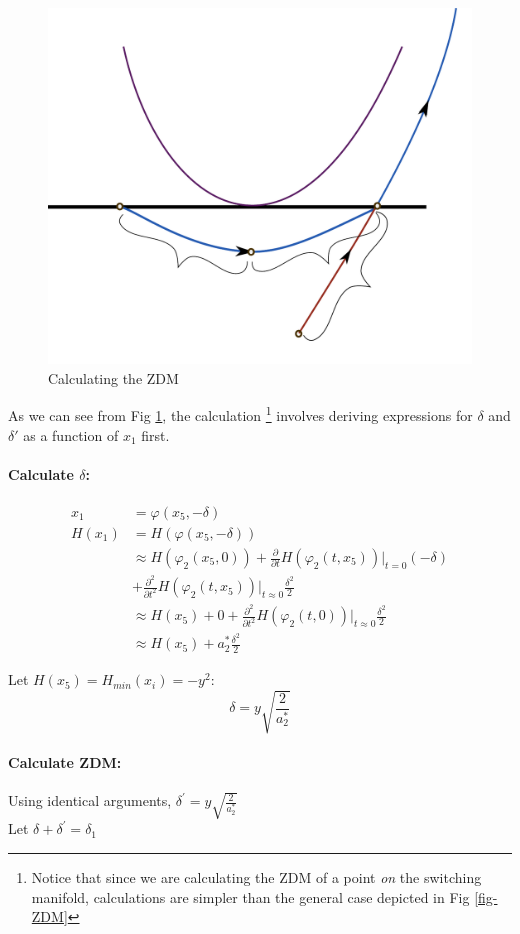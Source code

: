 \documentclass{book}
\renewcommand{\(}{\begin{columns}}
\renewcommand{\)}{\end{columns}}
\newcommand{\<}[1]{\begin{column}{#1}}
\renewcommand{\>}{\end{column}}
\newcommand{\para}{\paragraph}
\begin{document}
\begin{figure}
\begin{center}
\caption{Calculating the ZDM}
\label{fig-ZDM-calc}
\includegraphics[width=0.6\columnwidth]{ZDM_eval_2}
\end{center}
\end{figure} 

As we can see  from Fig \ref{fig-ZDM-calc}, the calculation \footnote{Notice that since we are calculating 
the ZDM of a point \emph{on} the switching manifold, calculations are simpler than the general case depicted in Fig \ref{fig-ZDM}} 
involves deriving expressions for $\delta$ and $\delta'$ as a function of $x_1$ 
first.   

\para{Calculate $\delta$:}

\begin{align*}
x_1&=\varphi(x_5,-\delta)\\
H(x_1)&=H(\varphi(x_5,-\delta))\\
&\approx H(\varphi_2(x_5,0))+\frac{\partial}{\partial t}H(\varphi_2(t,x_5))\left.  
\right|_{t=0}(-\delta)\\
&+\frac{\partial^2}{\partial t^2}H(\varphi_2(t,x_5))\left.\right|_{t\approx0}\frac{\delta^2}{2}\\
&\approx H(x_5)+0+\frac{\partial^2}{\partial 
t^2}H(\varphi_2(t,0))\left.\right|_{t\approx0}\frac{\delta^2}{2}\\
&\approx H(x_5)+a_2^*\frac{\delta^2}{2}
\end{align*}

Let $H(x_5)=H_{min}(x_i)=-y^2:$ 
\begin{equation}
\label{eq-d}
\delta=y\sqrt{\frac{2}{a_2^*}}
\end{equation}


\para{Calculate ZDM:}
Using identical arguments, $\delta^{\prime}=y\sqrt{\frac{2}{a_2^*}}$ \\
Let $\delta+\delta^{\prime}=\delta_1$
\end{document}
